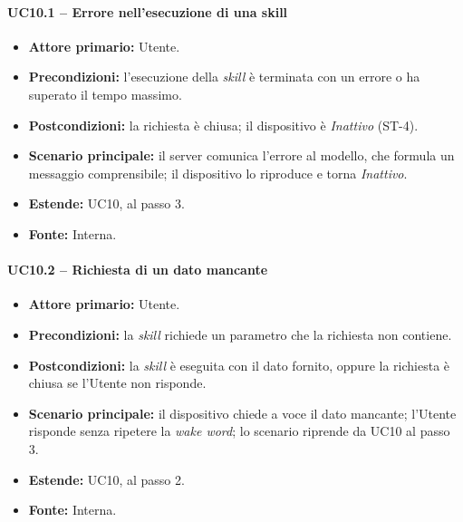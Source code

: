 \documentclass[12pt,a4paper]{article}
\newcommand{\tightlist}{\setlength{\itemsep}{1pt}\setlength{\parskip}{0pt}}
\begin{document}
\paragraph{UC10.1 -- Errore nell'esecuzione di una skill}
\begin{itemize}
\tightlist
\item \textbf{Attore primario:} Utente.
\item \textbf{Precondizioni:} l'esecuzione della \emph{skill} è terminata con un errore o ha superato il tempo massimo.
\item \textbf{Postcondizioni:} la richiesta è chiusa; il dispositivo è \emph{Inattivo} (ST-4).
\item \textbf{Scenario principale:} il server comunica l'errore al modello, che formula un messaggio comprensibile; il dispositivo lo riproduce e torna \emph{Inattivo}.
\item \textbf{Estende:} UC10, al passo 3.
\item \textbf{Fonte:} Interna.
\end{itemize}

\paragraph{UC10.2 -- Richiesta di un dato mancante}
\begin{itemize}
\tightlist
\item \textbf{Attore primario:} Utente.
\item \textbf{Precondizioni:} la \emph{skill} richiede un parametro che la richiesta non contiene.
\item \textbf{Postcondizioni:} la \emph{skill} è eseguita con il dato fornito, oppure la richiesta è chiusa se l'Utente non risponde.
\item \textbf{Scenario principale:} il dispositivo chiede a voce il dato mancante; l'Utente risponde senza ripetere la \emph{wake word}; lo scenario riprende da UC10 al passo 3.
\item \textbf{Estende:} UC10, al passo 2.
\item \textbf{Fonte:} Interna.
\end{itemize}
\end{document}
